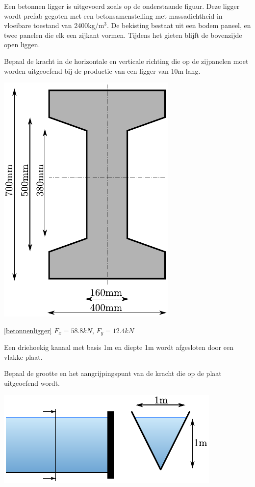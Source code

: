 \begin{toepassing}[*]
	\label{betonnenligger}
Een betonnen ligger is uitgevoerd zoals op de onderstaande figuur. Deze ligger wordt prefab gegoten met een betonsamenstelling met massadichtheid in vloeibare toestand van 2400kg/m$^3$. De bekisting bestaat uit een bodem paneel, en twee panelen die elk een zijkant vormen. Tijdens het gieten blijft de bovenzijde open liggen.
		
Bepaal de kracht in de horizontale en verticale richting die op de zijpanelen moet worden uitgeoefend bij de productie van een ligger van 10m lang.

	\centering
	\includegraphics{fig/hydrostatica/betonnenligger}
\end{toepassing}
\begin{antwoord}{\ref{betonnenligger}}
	$F_x = 58.8\unit{kN}$, $F_y = 12.4\unit{kN}$
\end{antwoord}
\begin{toepassing}
	\label{driehoekig_kanaal}
Een driehoekig kanaal met basis 1m en diepte 1m wordt afgesloten door een vlakke plaat.
		
Bepaal de grootte en het aangrijpingspunt van de kracht die op de plaat uitgeoefend wordt.

	\centering
	\includegraphics{fig/hydrostatica/driehoekig_kanaal}
\end{toepassing}
